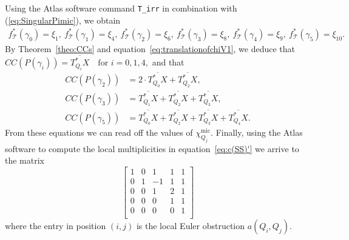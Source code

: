\documentclass[a4paper, 11pt]{article}
\begin{document}
Using the Atlas software command \texttt{T\_irr} in combination with
(\ref{eq:SingularPimic}), 
we obtain  
\begin{align*}
f_\mathcal{T}^{\ast}(\gamma_0)=\xi_1,\ 
f_\mathcal{T}^{\ast}(\gamma_1)=\xi_4,\ 
f_\mathcal{T}^{\ast}(\gamma_2)=\xi_6,\ 
f_\mathcal{T}^{\ast}(\gamma_3)=\xi_8,\ 
f_\mathcal{T}^{\ast}(\gamma_4)=\xi_9,\ 
f_\mathcal{T}^{\ast}(\gamma_5)=\xi_{10}.
\end{align*}
By Theorem~\ref{theo:CCs} and equation~\eqref{eq:translationofchiV1},
we deduce that 
$
CC(P(\gamma_i)) = \overline{T_{Q_i}^{\ast}X} \quad \text{for } i = 0, 1, 4,
$
and that 
\begin{align*}
CC(P(\gamma_{2})) &= 2\cdot \overline{T_{Q_0}^{\ast}X} +
\overline{T_{Q_2}^{\ast}X}, \\ 
CC(P(\gamma_3))   &= \overline{T_{Q_1}^{\ast}X} +
\overline{T_{Q_2}^{\ast}X} + \overline{T_{Q_3}^{\ast}X}, \\ 
CC(P(\gamma_5))   &= \overline{T_{Q_0}^{\ast}X} +
\overline{T_{Q_2}^{\ast}X} + \overline{T_{Q_3}^{\ast}X} +
\overline{T_{Q_4}^{\ast}X}. 
\end{align*} 
From these equations we can read off the values of $\chi_{Q_{j}}^{\mathrm{mic}}$.
Finally, using the Atlas software to compute the local
multiplicities in  equation~\eqref{eq:c(SS)'} we arrive to the
matrix
\[
\begin{bmatrix}
1 & 0 & 1 & 1 & 1 \\
0 & 1 & -1 & 1 & 1 \\
0 & 0 &  1& 2 & 1 \\
0 & 0 &  0& 1 & 1 \\
0 & 0 & 0 & 0 & 1 \\
\end{bmatrix}
\]
where the entry 
in position \((i, j)\) is the local Euler obstruction \(a(Q_i, Q_j)\). 




%
%
\end{document}
